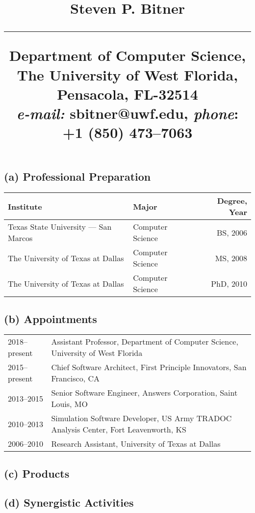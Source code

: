 \documentclass[svgnames,11pt]{article}
\title{%
        \vspace{-2\baselineskip}
            \normalsize
            {\textbf{Steven P. Bitner}}\\
            \vspace{0.5\baselineskip}
            \hrule
            \vspace{0.5\baselineskip}
            Department of Computer Science, The University of West Florida, Pensacola, FL-32514 \\
            \textit{e-mail:} sbitner@uwf.edu,
            \textit{phone}: +1 (850) 473--7063
        \vspace{-1.5ex}
}
\date{}
\begin{document}
\maketitle
\vspace{-4\baselineskip}
\subsection*{(a) Professional Preparation}
\begin{table}[H]
\centering
\begin{tabular}{llr}
\toprule
Institute                             & Major            & Degree, Year \\ \midrule
Texas State University --- San Marcos & Computer Science & BS, 2006     \\
The University of Texas at Dallas     & Computer Science & MS, 2008     \\
The University of Texas at Dallas     & Computer Science & PhD, 2010    \\
\end{tabular}
\end{table}

\subsection*{(b) Appointments}
\begin{table}[H]
\centering
\begin{tabular}{ll}
2018--present & Assistant Professor, Department of Computer Science, University of West Florida \\
2015--present & Chief Software Architect, First Principle Innovators, San Francisco, CA \\
2013--2015    & Senior Software Engineer, Answers Corporation, Saint Louis, MO \\
2010--2013    & Simulation Software Developer, US Army TRADOC Analysis Center, Fort Leavenworth, KS \\
2006--2010    & Research Assistant, University of Texas at Dallas
\end{tabular}
\end{table}
\subsection*{(c) Products}

\nocite{DBLP:journals/comgeo/BitnerD12}
\nocite{DBLP:conf/isvd/BitnerCD10}
\nocite{DBLP:conf/latin/BitnerCCDKW10}
\nocite{DBLP:journals/ipl/BitnerD09}




\subsection*{(d) Synergistic Activities}
\begin{enumerate}

\end{enumerate}
\end{document}
